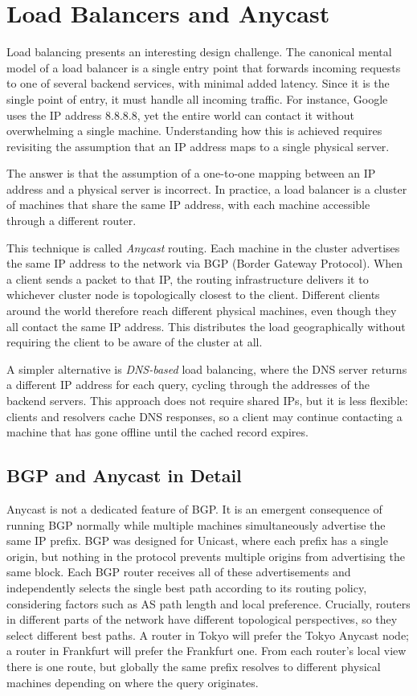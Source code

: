 
\chapter{Load Balancers and Anycast}
Load balancing presents an interesting design challenge. The canonical mental model of a load balancer is a single entry point that forwards incoming requests to one of several backend services, with minimal added latency. Since it is the single point of entry, it must handle all incoming traffic. For instance, Google uses the IP address 8.8.8.8, yet the entire world can contact it without overwhelming a single machine. Understanding how this is achieved requires revisiting the assumption that an IP address maps to a single physical server.

The answer is that the assumption of a one-to-one mapping between an IP address and a physical server is incorrect. In practice, a load balancer is a cluster of machines that share the same IP address, with each machine accessible through a different router.

This technique is called \textit{Anycast} routing. Each machine in the cluster advertises the same IP address to the network via BGP (Border Gateway Protocol). When a client sends a packet to that IP, the routing infrastructure delivers it to whichever cluster node is topologically closest to the client. Different clients around the world therefore reach different physical machines, even though they all contact the same IP address. This distributes the load geographically without requiring the client to be aware of the cluster at all.

A simpler alternative is \textit{DNS-based} load balancing, where the DNS server returns a different IP address for each query, cycling through the addresses of the backend servers. This approach does not require shared IPs, but it is less flexible: clients and resolvers cache DNS responses, so a client may continue contacting a machine that has gone offline until the cached record expires.

\section{BGP and Anycast in Detail}

Anycast is not a dedicated feature of BGP. It is an emergent consequence of running BGP normally while multiple machines simultaneously advertise the same IP prefix. BGP was designed for Unicast, where each prefix has a single origin, but nothing in the protocol prevents multiple origins from advertising the same block. Each BGP router receives all of these advertisements and independently selects the single best path according to its routing policy, considering factors such as AS path length and local preference. Crucially, routers in different parts of the network have different topological perspectives, so they select different best paths. A router in Tokyo will prefer the Tokyo Anycast node; a router in Frankfurt will prefer the Frankfurt one. From each router's local view there is one route, but globally the same prefix resolves to different physical machines depending on where the query originates.

